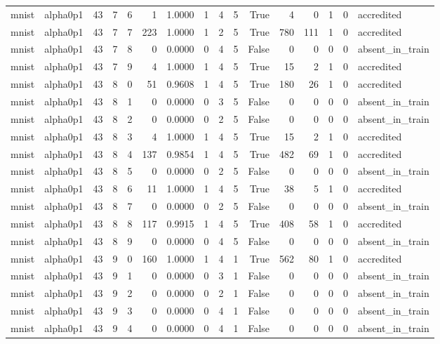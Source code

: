 \begin{tabular}{llrrrrrrrrrrrrrl}
mnist & alpha0p1 & 43 & 7 & 6 & 1 & 1.0000 & 1 & 4 & 5 & True & 4 & 0 & 1 & 0 & accredited \\
mnist & alpha0p1 & 43 & 7 & 7 & 223 & 1.0000 & 1 & 2 & 5 & True & 780 & 111 & 1 & 0 & accredited \\
mnist & alpha0p1 & 43 & 7 & 8 & 0 & 0.0000 & 0 & 4 & 5 & False & 0 & 0 & 0 & 0 & absent\_in\_train \\
mnist & alpha0p1 & 43 & 7 & 9 & 4 & 1.0000 & 1 & 4 & 5 & True & 15 & 2 & 1 & 0 & accredited \\
mnist & alpha0p1 & 43 & 8 & 0 & 51 & 0.9608 & 1 & 4 & 5 & True & 180 & 26 & 1 & 0 & accredited \\
mnist & alpha0p1 & 43 & 8 & 1 & 0 & 0.0000 & 0 & 3 & 5 & False & 0 & 0 & 0 & 0 & absent\_in\_train \\
mnist & alpha0p1 & 43 & 8 & 2 & 0 & 0.0000 & 0 & 2 & 5 & False & 0 & 0 & 0 & 0 & absent\_in\_train \\
mnist & alpha0p1 & 43 & 8 & 3 & 4 & 1.0000 & 1 & 4 & 5 & True & 15 & 2 & 1 & 0 & accredited \\
mnist & alpha0p1 & 43 & 8 & 4 & 137 & 0.9854 & 1 & 4 & 5 & True & 482 & 69 & 1 & 0 & accredited \\
mnist & alpha0p1 & 43 & 8 & 5 & 0 & 0.0000 & 0 & 2 & 5 & False & 0 & 0 & 0 & 0 & absent\_in\_train \\
mnist & alpha0p1 & 43 & 8 & 6 & 11 & 1.0000 & 1 & 4 & 5 & True & 38 & 5 & 1 & 0 & accredited \\
mnist & alpha0p1 & 43 & 8 & 7 & 0 & 0.0000 & 0 & 2 & 5 & False & 0 & 0 & 0 & 0 & absent\_in\_train \\
mnist & alpha0p1 & 43 & 8 & 8 & 117 & 0.9915 & 1 & 4 & 5 & True & 408 & 58 & 1 & 0 & accredited \\
mnist & alpha0p1 & 43 & 8 & 9 & 0 & 0.0000 & 0 & 4 & 5 & False & 0 & 0 & 0 & 0 & absent\_in\_train \\
mnist & alpha0p1 & 43 & 9 & 0 & 160 & 1.0000 & 1 & 4 & 1 & True & 562 & 80 & 1 & 0 & accredited \\
mnist & alpha0p1 & 43 & 9 & 1 & 0 & 0.0000 & 0 & 3 & 1 & False & 0 & 0 & 0 & 0 & absent\_in\_train \\
mnist & alpha0p1 & 43 & 9 & 2 & 0 & 0.0000 & 0 & 2 & 1 & False & 0 & 0 & 0 & 0 & absent\_in\_train \\
mnist & alpha0p1 & 43 & 9 & 3 & 0 & 0.0000 & 0 & 4 & 1 & False & 0 & 0 & 0 & 0 & absent\_in\_train \\
mnist & alpha0p1 & 43 & 9 & 4 & 0 & 0.0000 & 0 & 4 & 1 & False & 0 & 0 & 0 & 0 & absent\_in\_train \\

\end{tabular}

